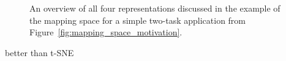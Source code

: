 \begin{figure}[h]
	\centering
\resizebox{1.00\textwidth}{!}{
   \begin{tikzpicture}
     
   \end{tikzpicture}
 }
   \caption{An overview of all four representations discussed in the example of the mapping space for a simple two-task application from Figure~\ref{fig:mapping_space_motivation}.}
   \label{fig:mapping_space_full}
\end{figure}


\cite{li2018visualizing} better than t-SNE